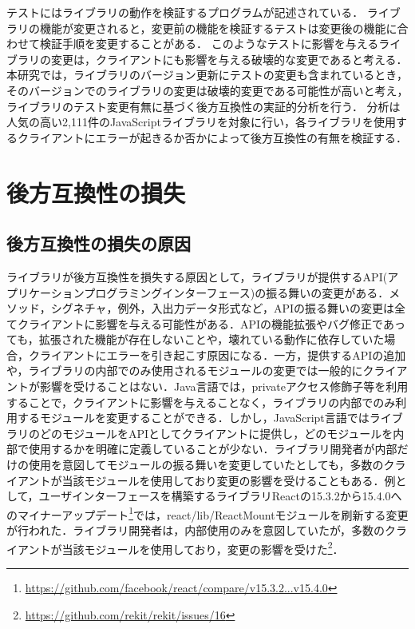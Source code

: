 \documentclass[submit]{ipsj}
\begin{document}
テストにはライブラリの動作を検証するプログラムが記述されている．
ライブラリの機能が変更されると，変更前の機能を検証するテストは変更後の機能に合わせて検証手順を変更することがある．
このようなテストに影響を与えるライブラリの変更は，クライアントにも影響を与える破壊的な変更であると考える．
本研究では，ライブラリのバージョン更新にテストの変更も含まれているとき，そのバージョンでのライブラリの変更は破壊的変更である可能性が高いと考え，ライブラリのテスト変更有無に基づく後方互換性の実証的分析を行う．
分析は人気の高い2,111件のJavaScriptライブラリを対象に行い，各ライブラリを使用するクライアントにエラーが起きるか否かによって後方互換性の有無を検証する．


\section{後方互換性の損失}\label{chap:backward-compatibility}

\subsection{後方互換性の損失の原因}
ライブラリが後方互換性を損失する原因として，ライブラリが提供するAPI(アプリケーションプログラミングインターフェース)の振る舞いの変更がある．メソッド，シグネチャ，例外，入出力データ形式など，APIの振る舞いの変更は全てクライアントに影響を与える可能性がある．APIの機能拡張やバグ修正であっても，拡張された機能が存在しないことや，壊れている動作に依存していた場合，クライアントにエラーを引き起こす原因になる．一方，提供するAPIの追加や，ライブラリの内部でのみ使用されるモジュールの変更では一般的にクライアントが影響を受けることはない．Java言語では，privateアクセス修飾子等を利用することで，クライアントに影響を与えることなく，ライブラリの内部でのみ利用するモジュールを変更することができる．しかし，JavaScript言語ではライブラリのどのモジュールをAPIとしてクライアントに提供し，どのモジュールを内部で使用するかを明確に定義していることが少ない．ライブラリ開発者が内部だけの使用を意図してモジュールの振る舞いを変更していたとしても，多数のクライアントが当該モジュールを使用しており変更の影響を受けることもある．例として，ユーザインターフェースを構築するライブラリReactの15.3.2から15.4.0へのマイナーアップデート\footnote{\url{https://github.com/facebook/react/compare/v15.3.2...v15.4.0}}では，react/lib/ReactMountモジュールを刷新する変更が行われた．ライブラリ開発者は，内部使用のみを意図していたが，多数のクライアントが当該モジュールを使用しており，変更の影響を受けた\footnote{\url{https://github.com/rekit/rekit/issues/16}}．
\end{document}
